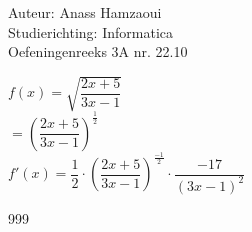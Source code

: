 \documentclass[a4paper]{article}
\begin{document}
  
\noindent \large Auteur: Anass Hamzaoui \\
\noindent \large Studierichting: Informatica \\
\noindent \large Oefeningenreeks 3A nr. 22.10\\

\medskip

\normalsize
$f(x) = \sqrt{\dfrac{2x+5}{3x-1}}$\\

$=\left(\dfrac{2x+5}{3x-1}\right)^{\tfrac{1}{2}}$\\

$f'(x) = \dfrac{1}{2} \cdot \left(\dfrac{2x+5}{3x-1}\right)^{\tfrac{-1}{2}} \cdot \dfrac{-17}{(3x-1)^2}$ \\

\begin{thebibliography}{999}
\end{thebibliography}
\end{document}
